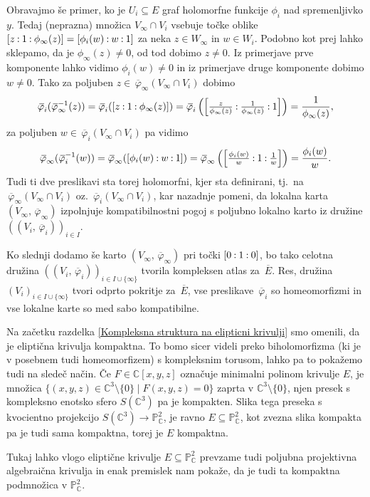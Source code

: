 \documentclass[mat1]{fmfdelo}
\numberwithin{equation}{section}
\newcommand{\C}{\mathbb C}
\newcommand{\PC}{\mathbb{P}^2_\C}
\newcommand{\inv}{^{-1}}
\newcommand{\pcoor}[1]{%
\begingroup\lccode`~=`: \lowercase{\endgroup
\edef~}{\mathbin{\mathchar\the\mathcode`:}\nobreak}%
\left[%
\begingroup
\mathcode`:=\string"8000
#1%
\endgroup
\right]%
}
\newcommand{\olsi}[1]{\,\overline{\!{#1}}} %
\newcommand{\tj}{tj.\ }
\theoremstyle{definition}
\begin{document}
Obravajmo še primer, ko je $U_i \subseteq E$ graf holomorfne funkcije $\phi_i$ nad spremenljivko $y$. Tedaj (neprazna) množica $V_\infty \cap V_i$ vsebuje točke oblike $\pcoor{z : 1 : \phi_\infty(z)} = \pcoor{\phi_i(w) : w : 1}$ za neka $z \in W_\infty$ in $w \in W_i$. Podobno kot prej lahko sklepamo, da je $\phi_\infty(z) \neq 0$, od tod dobimo $z \neq 0$. Iz primerjave prve komponente lahko vidimo $\phi_i(w) \neq 0$ in iz primerjave druge komponente dobimo $w \neq 0$. Tako za poljuben $z \in \olsi{\varphi}_\infty(V_\infty \cap V_i)$ dobimo
\[
    \olsi{\varphi}_i (\olsi{\varphi}_\infty\inv (z)) = 
    \olsi{\varphi}_i (\pcoor{z : 1 : \phi_\infty(z)}) = 
    \olsi{\varphi}_i \left(\pcoor{\tfrac{z}{\phi_\infty(z)} : \tfrac{1}{\phi_\infty(z)} : 1}\right) = 
    \frac{1}{\phi_\infty(z)},
\]
za poljuben $w \in \olsi{\varphi}_i(V_\infty \cap V_i)$ pa vidimo
\[
    \olsi{\varphi}_\infty (\olsi{\varphi}_i\inv(w)) =
    \olsi{\varphi}_\infty (\pcoor{\phi_i(w) : w : 1}) =
    \olsi{\varphi}_\infty \left(\pcoor{\tfrac{\phi_i(w)}{w} : 1 : \tfrac{1}{w}}\right) = 
    \frac{\phi_i(w)}{w}.
\]
Tudi ti dve preslikavi sta torej holomorfni, kjer sta definirani, \tj na $\olsi{\varphi}_\infty(V_\infty \cap V_i)$ oz. $\olsi{\varphi}_i(V_\infty \cap V_i)$, kar nazadnje pomeni, da lokalna karta $(V_\infty, \olsi{\varphi}_\infty)$ izpolnjuje kompatibilnostni pogoj s poljubno lokalno karto iz družine $((V_i, \olsi{\varphi}_i))_{i \in I}$.

Ko slednji dodamo še karto $(V_\infty, \olsi{\varphi}_\infty)$ pri točki $\pcoor{0 : 1 : 0}$, bo tako celotna družina $((V_i,\olsi{\varphi}_i))_{i \in I \cup \{\infty\}}$ tvorila kompleksen atlas za $\olsi{E}$. Res, družina $(V_i)_{i \in I \cup \{\infty\}}$ tvori odprto pokritje za $\olsi{E}$, vse preslikave $\olsi{\varphi}_i$ so homeomorfizmi in vse lokalne karte so med sabo kompatibilne. 

\begin{opomba}
    Na začetku razdelka \ref{Kompleksna struktura na elipticni krivulji} smo omenili, da je eliptična krivulja kompaktna. To bomo sicer videli preko biholomorfizma (ki je v posebnem tudi homeomorfizem) s kompleksnim torusom, lahko pa to pokažemo tudi na sledeč način. Če $F \in \C[x,y,z]$ označuje minimalni polinom krivulje $E$, je množica $\{ (x,y,z) \in \C^3\setminus\{0\} \mid F(x,y,z) = 0\}$ zaprta v $\C^3\setminus\{0\}$, njen presek s kompleksno enotsko sfero $S(\C^3)$ pa je kompakten. Slika tega preseka s kvocientno projekcijo $S(\C^3) \to \PC$, je ravno $E\subseteq \PC$, kot zvezna slika kompakta pa je tudi sama kompaktna, torej je $E$ kompaktna. 
    
    Tukaj lahko vlogo eliptične krivulje $E \subseteq \PC$ prevzame tudi poljubna projektivna algebraična krivulja in enak premislek nam pokaže, da je tudi ta kompaktna podmnožica v $\PC$.
\end{opomba}
\end{document}
